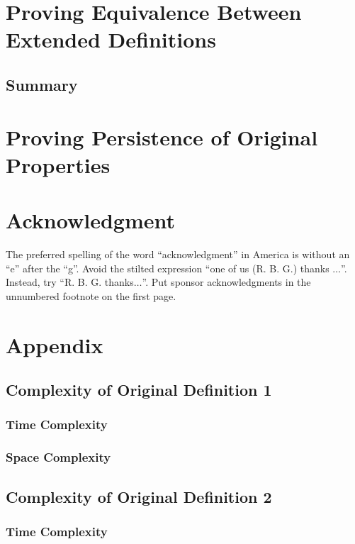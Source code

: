 \documentclass[conference]{IEEEtran}
\begin{document}
\section{Proving Equivalence Between Extended Definitions}

\subsection{Summary}

\section{Proving Persistence of Original Properties}

\section{Acknowledgment}

The preferred spelling of the word ``acknowledgment'' in America is without 
an ``e'' after the ``g''. Avoid the stilted expression ``one of us (R. B. 
G.) thanks $\ldots$''. Instead, try ``R. B. G. thanks$\ldots$''. Put sponsor 
acknowledgments in the unnumbered footnote on the first page.

\section{Appendix}

\subsection{Complexity of Original Definition 1}

\subsubsection{Time Complexity}

\subsubsection{Space Complexity}

\subsection{Complexity of Original Definition 2}

\subsubsection{Time Complexity}
\end{document}
